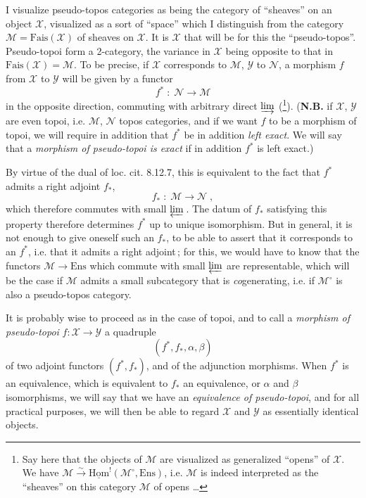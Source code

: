 \documentclass[11pt]{article}
\newcommand{\printedpage}[1]{\marginpar{\footnotesize p.~#1}}
\newcommand{\msp}[1]{\marginpar{\footnotesize [#1]}}
\newcommand{\uHom}{\underline{\mathrm{Hom}}}
\newcommand{\Ens}{\mathrm{Ens}}
\newcommand{\Fais}{\mathrm{Fais}}
\begin{document}
I visualize pseudo-topos categories as being the category of ``sheaves'' on an object $\mathcal{X}$, visualized as a sort of ``space'' which I distinguish from the category $\mathcal{M}=\Fais(\mathcal{X})$ of sheaves on $\mathcal{X}$. It is $\mathcal{X}$ that will be for this the ``pseudo-topos''. Pseudo-topoi form a 2-category, the variance in $\mathcal{X}$ being opposite to that in $\Fais(\mathcal{X})=\mathcal{M}$. To be precise, if $\mathcal{X}$ corresponds to $\mathcal{M}$, $\mathcal{Y}$ to $\mathcal{N}$, a morphism $f$ from $\mathcal{X}$ to $\mathcal{Y}$ will be given by a functor
\[
f^* \;:\; \mathcal{N} \longrightarrow \mathcal{M}
\tag*{(4.1.1)}
\]
in the opposite direction, commuting with arbitrary direct $\varinjlim$ (\footnote{Say here that the objects of $\mathcal{M}$ are visualized as generalized ``opens'' of $\mathcal{X}$. We have $\mathcal{M}\xrightarrow{\sim}\uHom^!(\mathcal{M}^\circ,\Ens)$, i.e. $\mathcal{M}$ is indeed interpreted as the ``sheaves'' on this category $\mathcal{M}$ of opens \ldots}). (\textbf{N.B.} if $\mathcal{X}$, $\mathcal{Y}$ are even topoi, i.e. $\mathcal{M}$, $\mathcal{N}$ topos categories, and if we want $f$ to be a morphism of topoi, we will require in addition that $f^*$ be in addition \textit{left exact}. We will say that a \textit{morphism of pseudo-topoi is exact} if in addition $f^*$ is left exact.)

\msp{page 52}
By virtue of the dual of loc. cit. 8.12.7, this is equivalent to the fact that $f^*$ admits a right adjoint $f_*$,
\[
f_* \;:\; \mathcal{M} \longrightarrow \mathcal{N}\;,
\tag*{(4.1.2)}
\]
which therefore commutes with small $\varprojlim$\,. The datum of $f_*$ satisfying this property therefore determines $f^*$ up to unique isomorphism. But in general, it is not enough to give oneself such an $f_*$, to be able to assert that it corresponds to an $f^*$, i.e. that it admits a right adjoint\,; for this, we would have to know that the functors $\mathcal{M}\longrightarrow\Ens$ which commute with small $\varprojlim$ are representable, which will be the case if $\mathcal{M}$ admits a small subcategory that is \textit{co}generating, i.e. if $\mathcal{M}^\circ$ is also a pseudo-topos category. %

\newpage

\printedpage{2}

It is probably wise to proceed as in the case of topoi, and to call a \textit{morphism of pseudo-topoi} $f:\mathcal{X}\longrightarrow\mathcal{Y}$ a quadruple
\[
(f^*,f_*,\alpha,\beta)
\tag*{(4.1.3)}
\]
\msp{page 53}
of two adjoint functors $(f^*,f_*)$, and of the adjunction morphisms. When $f^*$ is an equivalence, which is equivalent to $f_*$ an equivalence, or $\alpha$ and $\beta$ isomorphisms, we will say that we have an \textit{equivalence of pseudo-topoi}, and for all practical purposes, we will then be able to regard $\mathcal{X}$ and $\mathcal{Y}$ as essentially identical objects.
\end{document}
